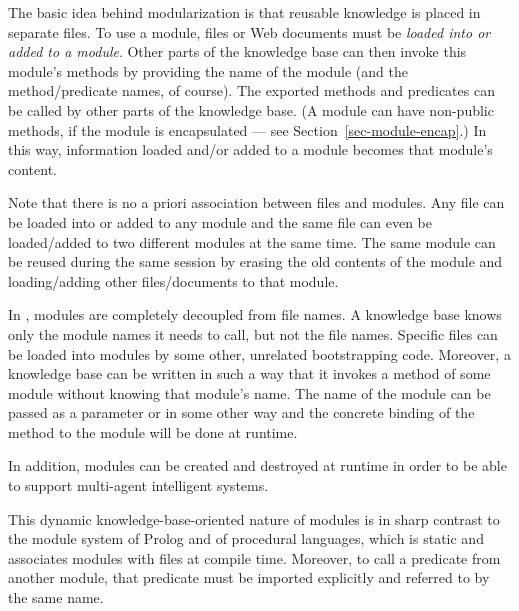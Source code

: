 \documentclass[11pt]{article}
\newcommand{\ERGO}{\mbox{\smaller{\ensuremath{\cal{E}}\smaller{{\sc{RGO}}}}}\xspace}
\newcommand{\FLSYSTEM}{\ERGO}
\begin{document}
The basic idea behind \FLSYSTEM modularization is that reusable knowledge
is placed in separate files.  To use a module, files or Web documents must be
\emph{loaded into or added to a module}. Other parts of the knowledge base can then invoke
this module's methods by providing the name of the module (and the
method/predicate names, of course).  
The exported methods and predicates can be called by other
parts of the knowledge base. (A module can have non-public methods, if the module
is encapsulated ---
see Section~\ref{sec-module-encap}.)
In this way, information loaded and/or added
to a module becomes that module's content.

Note that there is no a priori association between files and modules.  Any
file can be loaded into or added to
any module and the same file can even be loaded/added
to two different modules at the same time. The same module can be reused
during the same \FLSYSTEM session by erasing the old contents of the module
and loading/adding other files/documents
to that module.

In \FLSYSTEM, modules are completely decoupled from file names. A
knowledge base knows only the module names it needs to call, but not the file
names. Specific files can be loaded into modules by some other, unrelated
bootstrapping code. Moreover, a knowledge base can be written in such a way
that it invokes a method of some module without knowing that module's name.
The name of the module can be passed as a parameter or in some other way
and the concrete binding of the method to the module will be done at
runtime.

In addition, modules can be created and destroyed at runtime in order to be
able to support multi-agent intelligent systems.

This dynamic knowledge-base-oriented
nature of \FLSYSTEM modules
is in sharp contrast to the module
system of Prolog and of procedural languages, which is static and associates modules with files at compile
time. Moreover, to call a predicate from another module, that predicate
must be imported explicitly and referred to by the same name.
\end{document}
